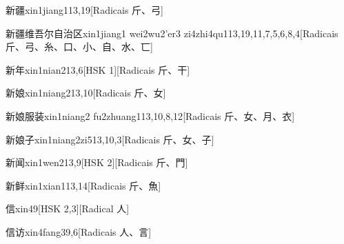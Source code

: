 \begin{entry}{新疆}{xin1jiang1}{13,19}[Radicais ⽄、⼸]
\end{entry}

\begin{entry}{新疆维吾尔自治区}{xin1jiang1 wei2wu2'er3 zi4zhi4qu1}{13,19,11,7,5,6,8,4}[Radicais ⽄、⼸、⽷、⼝、⼩、⾃、⽔、⼖]
\end{entry}

\begin{entry}{新年}{xin1nian2}{13,6}[HSK 1][Radicais ⽄、⼲]
\end{entry}

\begin{entry}{新娘}{xin1niang2}{13,10}[Radicais ⽄、⼥]
\end{entry}

\begin{entry}{新娘服装}{xin1niang2 fu2zhuang1}{13,10,8,12}[Radicais ⽄、⼥、⽉、⾐]
\end{entry}

\begin{entry}{新娘子}{xin1niang2zi5}{13,10,3}[Radicais ⽄、⼥、⼦]
\end{entry}

\begin{entry}{新闻}{xin1wen2}{13,9}[HSK 2][Radicais ⽄、⾨]
\end{entry}

\begin{entry}{新鲜}{xin1xian1}{13,14}[Radicais ⽄、⿂]
\end{entry}

\begin{entry}{信}{xin4}{9}[HSK 2,3][Radical ⼈]
\end{entry}

\begin{entry}{信访}{xin4fang3}{9,6}[Radicais ⼈、⾔]
\end{entry}

